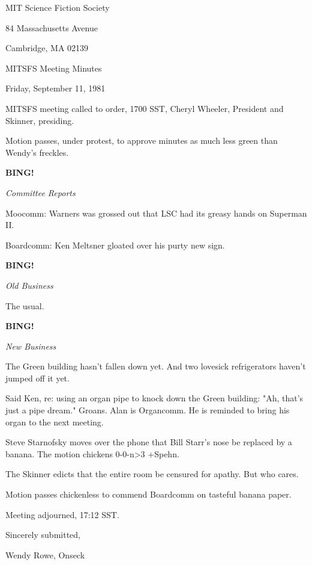\documentclass[12pt]{article}
\newcommand{\bing}{{\bf BING!} }
\newcommand{\goto}[1]{\bing \vskip 12pt \centerline{{\em{#1}}}}
\begin{document}
\begin{center}

MIT Science Fiction Society 

84 Massachusetts Avenue

Cambridge, MA 02139

\vspace{12pt}

MITSFS Meeting Minutes 

Friday, September 11, 1981

\end{center}
 
\vspace{18pt}

\setlength{\parskip}{6pt}

\noindent
MITSFS meeting called to order, 1700 SST,
Cheryl Wheeler, President and Skinner, presiding.

Motion passes, under protest, to approve minutes as much less green than Wendy's freckles.

\goto{Committee Reports}

Moocomm: Warners was grossed out that LSC had its greasy hands on Superman II.

Boardcomm: Ken Meltsner gloated over his purty new sign.

\goto{Old Business}

The usual.

\goto{New Business}

The Green building hasn't fallen down yet. And two lovesick refrigerators haven't jumped off it yet.

Said Ken, re: using an organ pipe to knock down the Green building: "Ah, that's just a pipe dream." Groans. Alan is Organcomm. He is reminded to bring his organ to the next meeting.

Steve Starnofsky moves over the phone that Bill Starr's nose be replaced by a banana. The motion chickens 0-0-n>3 +Spehn.

The Skinner edicts that the entire room be censured for apathy. But who cares.

Motion passes chickenless to commend Boardcomm on tasteful banana paper.

\vspace{12pt}

\noindent
Meeting adjourned, 17:12 SST.

\vspace{18pt}

\centerline{Sincerely submitted,}
\centerline{Wendy Rowe, Onseck}
\end{document}
